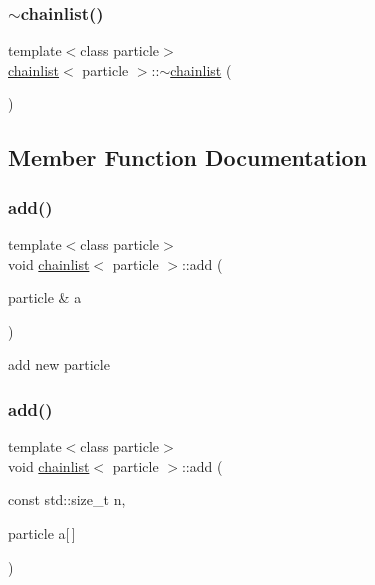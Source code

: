 \hypertarget{classchainlist_a94280239766a3dcc0648813fbe14dcc1}{}\label{classchainlist_a94280239766a3dcc0648813fbe14dcc1} 
\subsubsection{\texorpdfstring{$\sim$chainlist()}{~chainlist()}}
{\footnotesize\ttfamily template$<$class particle$>$ \\
\hyperlink{classchainlist}{chainlist}$<$ particle $>$\+::$\sim$\hyperlink{classchainlist}{chainlist} (\begin{DoxyParamCaption}{ }\end{DoxyParamCaption})\hspace{0.3cm}{\ttfamily [inline]}}



\subsection{Member Function Documentation}
\hypertarget{classchainlist_a0d56fff164cdb326e41e5f4bfd69cfa7}{}\label{classchainlist_a0d56fff164cdb326e41e5f4bfd69cfa7} 
\subsubsection{\texorpdfstring{add()}{add()}\hspace{0.1cm}{\footnotesize\ttfamily [1/3]}}
{\footnotesize\ttfamily template$<$class particle$>$ \\
void \hyperlink{classchainlist}{chainlist}$<$ particle $>$\+::add (\begin{DoxyParamCaption}\item[{particle \&}]{a }\end{DoxyParamCaption})\hspace{0.3cm}{\ttfamily [inline]}}



add new particle 

\hypertarget{classchainlist_a7099a6d3ef768761fdcadc796a1aee62}{}\label{classchainlist_a7099a6d3ef768761fdcadc796a1aee62} 
\subsubsection{\texorpdfstring{add()}{add()}\hspace{0.1cm}{\footnotesize\ttfamily [2/3]}}
{\footnotesize\ttfamily template$<$class particle$>$ \\
void \hyperlink{classchainlist}{chainlist}$<$ particle $>$\+::add (\begin{DoxyParamCaption}\item[{const std\+::size\+\_\+t}]{n,  }\item[{particle}]{a\mbox{[}$\,$\mbox{]} }\end{DoxyParamCaption})\hspace{0.3cm}{\ttfamily [inline]}}



